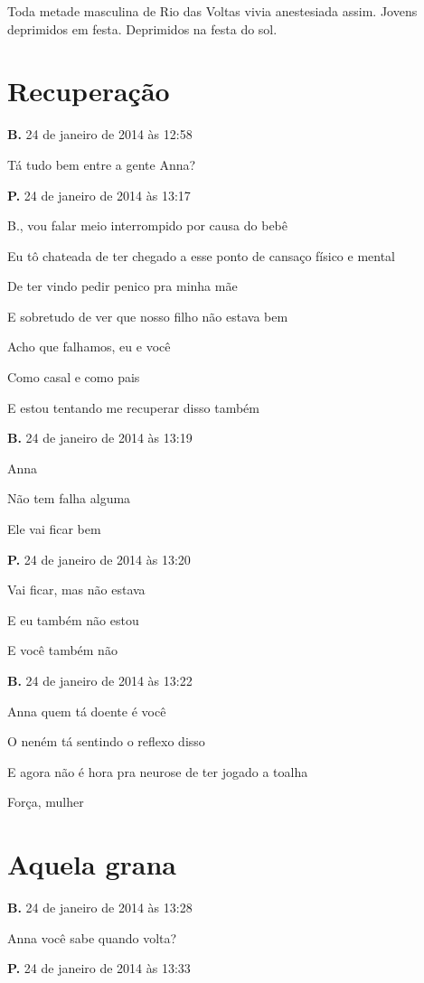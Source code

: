 {Toda metade masculina de Rio das Voltas vivia anestesiada assim. Jovens
deprimidos em festa. Deprimidos na festa do sol.

\chapter{Recuperação}


{\parindent0pt\parskip1pt\raggedright
\textbf{B.} 24 de janeiro de 2014 às 12:58

Tá tudo bem entre a gente Anna?

\textbf{P.} 24 de janeiro de 2014 às 13:17

B., vou falar meio interrompido por causa do bebê

Eu tô chateada de ter chegado a esse ponto de cansaço físico e mental

De ter vindo pedir penico pra minha mãe

E sobretudo de ver que nosso filho não estava bem

Acho que falhamos, eu e você

Como casal e como pais

E estou tentando me recuperar disso também

\textbf{B.} 24 de janeiro de 2014 às 13:19

Anna

Não tem falha alguma

Ele vai ficar bem

\textbf{P.} 24 de janeiro de 2014 às 13:20

Vai ficar, mas não estava

E eu também não estou

E você também não

\textbf{B.} 24 de janeiro de 2014 às 13:22

Anna quem tá doente é você

O neném tá sentindo o reflexo disso

E agora não é hora pra neurose de ter jogado a toalha

Força, mulher
}

\chapter{Aquela grana}

{\parindent0pt\parskip1pt\raggedright
\textbf{B.} 24 de janeiro de 2014 às 13:28

Anna você sabe quando volta?

\textbf{P.} 24 de janeiro de 2014 às 13:33

}}
